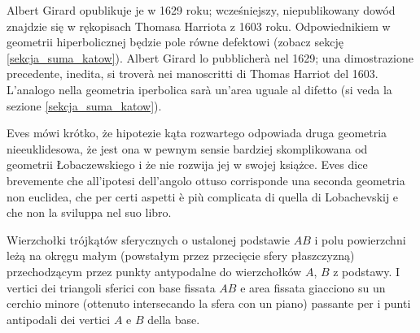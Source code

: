 Albert Girard opublikuje je w 1629 roku; wcześniejszy, niepublikowany dowód znajdzie się w rękopisach Thomasa Harriota z 1603 roku. %
Odpowiednikiem w geometrii hiperbolicznej będzie pole równe defektowi (zobacz sekcję \ref{sekcja_suma_katow}). %
Albert Girard lo pubblicherà nel 1629; una dimostrazione precedente, inedita, si troverà nei manoscritti di Thomas Harriot del 1603. %
L'analogo nella geometria iperbolica sarà un'area uguale al difetto (si veda la sezione \ref{sekcja_suma_katow}). %
%
%

Eves \cite[s. 314--315]{eves1_1972} mówi krótko, że hipotezie kąta rozwartego odpowiada druga geometria nieeuklidesowa, że jest ona w pewnym sensie bardziej skomplikowana od geometrii Łobaczewskiego i że nie rozwija jej w swojej książce. %
Eves \cite[p. 314--315]{eves1_1972} dice brevemente che all'ipotesi dell'angolo ottuso corrisponde una seconda geometria non euclidea, che per certi aspetti è più complicata di quella di Lobachevskij e che non la sviluppa nel suo libro. %

\begin{proposition}
[twierdzenie Lexella] %
[teorema di Lexell] %
	Wierzchołki trójkątów sferycznych o ustalonej podstawie $AB$ i polu powierzchni leżą na okręgu małym (powstałym przez przecięcie sfery płaszczyzną) przechodzącym przez punkty antypodalne do wierzchołków $A$, $B$ z podstawy. %
	I vertici dei triangoli sferici con base fissata $AB$ e area fissata giacciono su un cerchio minore (ottenuto intersecando la sfera con un piano) passante per i punti antipodali dei vertici $A$ e $B$ della base. %
\end{proposition}

